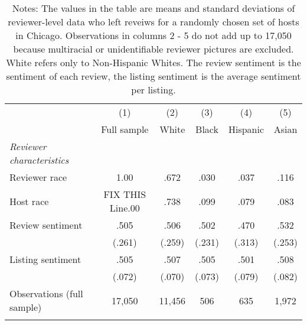 
{
	\begin{longtable}{l*{5}{c}}
		\caption{Summary Statistics by Race: Reviewer Characteristics}\\
		\hline
		&\multicolumn{1}{c}{(1)}&\multicolumn{1}{c}{(2)}&\multicolumn{1}{c}{(3)}&\multicolumn{1}{c}{(4)}&\multicolumn{1}{c}{(5)}\\
		&\multicolumn{1}{c}{Full sample}&\multicolumn{1}{c}{White}&\multicolumn{1}{c}{Black}&\multicolumn{1}{c}{Hispanic}&\multicolumn{1}{c}{Asian}\\
		\hline\hline                

		\textit{Reviewer characteristics} \\
		\hline
		Reviewer race            &      1.00	&      .672  	&    .030     &      .037    &	.116     \\
		[1em]
		Host race            &      FIX THIS Line.00      &      .738   &   .099   &  .079    &	    .083     \\
		[1em]
		Review sentiment            &      .505  	&      .506     &    .502     &      .470    &	.532     \\
		&     (.261)         &     (.259)         &     (.231)         &     (.313)         &		(.253)\\
		[1em]
		Listing sentiment            &    .505  &    .507   &   .505   &  .501    &	    .508     \\
		&     (.072)         &     (.070)    &     (.073)   &     (.079)    &	(.082)\\
		
		\hline
		Observations (full sample)     & 17,050   &   11,456     &   506     &   635    &  1,972     \\
		\hline\hline
		\caption*{Notes: The values in the table are means and standard deviations of reviewer-level data who left reveiws for a randomly chosen set of hosts in Chicago. Observations in columns 2 - 5 do not add up to 17,050 because multiracial or unidentifiable reviewer pictures are excluded. White refers only to Non-Hispanic Whites. The review sentiment is the sentiment of each review, the listing sentiment is the average sentiment per listing.}
		
	\end{longtable}
}

